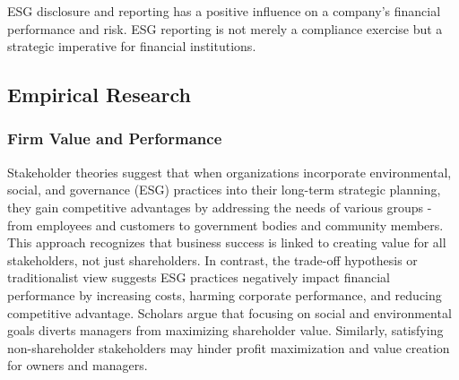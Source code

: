 \documentclass[
  authoryear]{elsarticle}
\begin{document}
ESG disclosure and reporting has a positive influence on a company's
financial performance and risk. ESG reporting is not merely a compliance
exercise but a strategic imperative for financial institutions.

\subsection{Empirical Research}\label{empirical-research}

\subsubsection{Firm Value and
Performance}\label{firm-value-and-performance}

Stakeholder theories \citep[see][]{FREEMAN1984, DEEGAN2002} suggest that
when organizations incorporate environmental, social, and governance
(ESG) practices into their long-term strategic planning, they gain
competitive advantages by addressing the needs of various groups - from
employees and customers to government bodies and community members. This
approach recognizes that business success is linked to creating value
for all stakeholders, not just shareholders. In contrast, the trade-off
hypothesis or traditionalist view \citep[see][]{FRIEDMAN2007} suggests
ESG practices negatively impact financial performance by increasing
costs, harming corporate performance, and reducing competitive
advantage. Scholars argue that focusing on social and environmental
goals diverts managers from maximizing shareholder value. Similarly,
satisfying non-shareholder stakeholders may hinder profit maximization
and value creation for owners and managers\citep{GALANT2017}.
\end{document}
